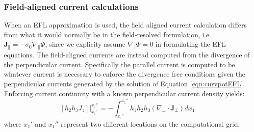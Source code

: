 \documentclass[11pt,letterpaper]{article}
\begin{document}
\subsubsection{Field-aligned current calculations}

When an EFL approximation is used, the field aligned current calculation differs from what it would normally be in the field-resolved formulation, i.e. $\mathbf{J}_\parallel=-\sigma_0 \nabla_\parallel \Phi$, since we explicity assume $\nabla_\parallel \Phi = 0$ in formulating the EFL equations.  The field-aligned currents are instead computed from the divergence of the perpendicular current.  Specifically the parallel current is computed to be whatever current is necessary to enforce the divergence free conditions given the perpendicular currents generated by the solution of Equation \ref{eqn:curvpotEFL}.  Enforcing current continuity with a known perpendicular current density yields:
\begin{equation}
\left. \left[ h_2 h_3 J_1 \right] \right|_{x_1'}^{x_1''} = - \int_{x_1'}^{x_{1}''} h_1 h_2 h_3 \left( \nabla_\perp \cdot \mathbf{J}_\perp \right) d x_1 \label{eqn:FACcalc}
\end{equation}
where $x_1'$ and $x_1''$ represent two different locations on the computational grid.  
\end{document}
